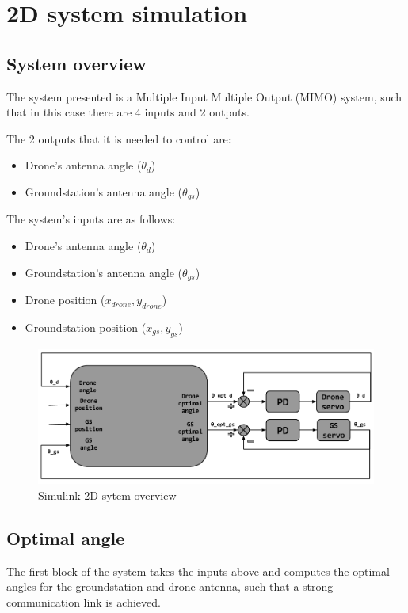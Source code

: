 \section{2D system simulation}

\subsection{System overview}
The system presented is a Multiple Input Multiple Output (MIMO) system, such that in this case there are 4 inputs and 2 outputs. 

The 2 outputs that it is needed to control are:
\begin{itemize}
	\item Drone's antenna angle ($\theta_{d}$)
	\item Groundstation's antenna angle ($\theta_{gs}$)
\end{itemize}

The system's inputs are as follows:
\begin{itemize}
	\item Drone's antenna angle ($\theta_{d}$)
	\item Groundstation's antenna angle ($\theta_{gs}$)
	\item Drone position ($x_{drone},y_{drone}$)
	\item Groundstation position ($x_{gs},y_{gs}$)
\end{itemize}

\begin{figure}
	\centering
	\includegraphics[scale=0.42]{figures/2d_system.png}
	\caption{Simulink 2D sytem overview}
	\label{fig:2d_system}
\end{figure}

\subsection{Optimal angle}
The first block of the system takes the inputs above and computes the optimal angles for the groundstation and drone antenna, such that a strong communication link is achieved.  



